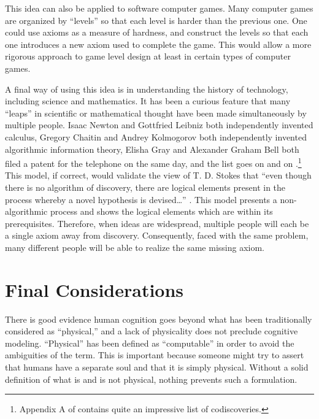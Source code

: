 This idea can also be applied to software computer games.  Many computer games are organized by ``levels'' so that each level is harder than the previous one.  One could use axioms as a measure of hardness, and construct the levels so that each one introduces a new axiom used to complete the game.  This would allow a more rigorous approach to game level design at least in certain types of computer games.

A final way of using this idea is in understanding the history of technology, including science and mathematics.  It has been a curious feature that many ``leaps'' in scientific or mathematical thought have been made simultaneously by multiple people.  Isaac Newton and Gottfried Leibniz both independently invented calculus, Gregory Chaitin and Andrey Kolmogorov both independently invented algorithmic information theory, Elisha Gray and Alexander Graham Bell both filed a patent for the telephone on the same day, and the list goes on and on .\footnote{Appendix A of \citet{aboitesetal2012} contains quite an impressive list of codiscoveries.}  This model, if correct, would validate the view of T. D. Stokes that ``even though there is no algorithm of discovery, there are logical elements present in the process whereby a novel hypothesis is devised\ldots{}'' \citep[][p.~111]{stokes1986}.  This model presents a non-algorithmic process and shows the logical elements which are within its prerequisites.  Therefore, when ideas are widespread, multiple people will each be a single axiom away from discovery.  Consequently, faced with the same problem, many different people will be able to realize the same missing axiom.

\section{Final Considerations}
\label{sec:final_considerations}

There is good evidence human cognition goes beyond what has been traditionally considered as ``physical,'' and a lack of physicality does not preclude cognitive modeling.  ``Physical'' has been defined as ``computable'' in order to avoid the ambiguities of the term.  This is important because someone might try to assert that humans have a separate soul and that it is simply physical.  Without a solid definition of what is and is not physical, nothing prevents such a formulation.   

